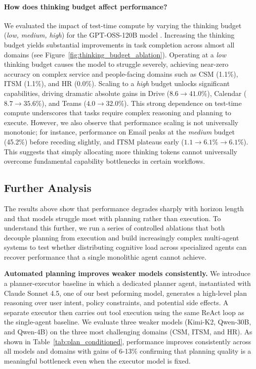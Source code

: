\paragraph{How does thinking budget affect performance?}
We evaluated the impact of test-time compute by varying the thinking budget (\textit{low, medium, high}) for the GPT-OSS-120B model \citep{openai2025gptoss120bgptoss20bmodel}. Increasing the thinking budget yields substantial improvements in task completion across almost all domains (see Figure~\ref{fig:thinking_budget_ablation}). Operating at a \textit{low} thinking budget causes the model to struggle severely, achieving near-zero accuracy on complex service and people-facing domains such as CSM (1.1\%), ITSM (1.1\%), and HR (0.0\%). Scaling to a \textit{high} budget unlocks significant capabilities, driving dramatic absolute gains in Drive ($8.6 \to 41.0$\%), Calendar ($8.7 \to 35.6$\%), and Teams ($4.0 \to 32.0$\%). This strong dependence on test-time compute underscores that \ours{} tasks require complex reasoning and planning to execute. However, we also observe that performance scaling is not universally monotonic; for instance, performance on Email peaks at the \textit{medium} budget (45.2\%) before receding slightly, and ITSM plateaus early ($1.1 \to 6.1\% \to 6.1\%$). This suggests that simply allocating more thinking tokens cannot universally overcome fundamental capability bottlenecks in certain workflows.

\subsection{Further Analysis}



The results above show that performance degrades sharply with horizon length and that models struggle most with planning rather than execution. To understand this further, we run a series of controlled ablations that both decouple planning from execution and build increasingly complex multi-agent systems to test whether distributing cognitive load across specialized agents can recover performance that a single monolithic agent cannot achieve.

\textbf{Automated planning improves weaker models consistently.} We introduce a planner-executor baseline in which a dedicated planner agent, instantiated with Claude Sonnet 4.5, one of our best peforming model, generates a high-level plan reasoning over user intent, policy constraints, and potential side effects. A separate executor then carries out tool execution using the same ReAct loop as the single-agent baseline. We evaluate three weaker models (Kimi-K2, Qwen-30B, and Qwen-4B) on the three most challenging domains (CSM, ITSM, and HR). As shown in Table~\ref{tab:plan_conditioned}, performance improves consistently across all models and domains with gains of 6-13\% confirming that planning quality is a meaningful bottleneck even when the executor model is fixed. 

